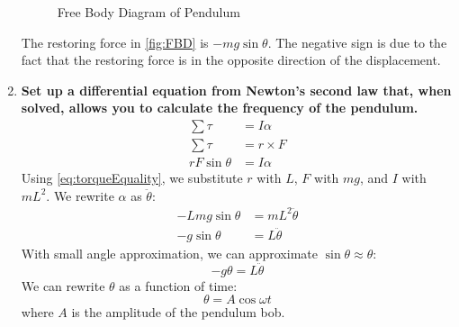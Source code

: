 \documentclass[article, 12pt]{article}
\begin{document}
\begin{enumerate}[1)]
\begin{figure}[H]
        \caption{Free Body Diagram of Pendulum}
        \label{fig:FBD}
    \end{figure}
    The restoring force in \autoref{fig:FBD} is $-mg\sin{\theta}$. The negative sign is due to the fact that the restoring force is in the opposite direction of the displacement.
    \item \textbf{Set up a differential equation from Newton's second law that, when solved, allows you to calculate the frequency of the pendulum.} \label{q:diffRotation} \\
    \begin{align}        \label{eq:torqueEquality}
        \sum \tau &= I\alpha \nonumber \\
        \sum \tau &= r \times F \nonumber \\
        rF\sin{\theta} &= I\alpha
    \end{align}
    Using \autoref{eq:torqueEquality}, we substitute $r$ with $L$, $F$ with $mg$, and $I$ with $mL^2$. We rewrite $\alpha$ as $\ddot{\theta}$:
    \begin{align}
        -Lmg\sin{\theta} &= mL^2\ddot{\theta} \nonumber \\
        -g\sin{\theta} &= L\ddot{\theta}
    \end{align}
    With small angle approximation, we can approximate $\sin{\theta} \approx \theta$:
    \begin{equation}        \label{eq:torqueSmallAngleApprox}
        -g\theta = L\ddot{\theta}
    \end{equation}
    We can rewrite $\theta$ as a function of time:
    \begin{equation}        \label{eq:theta}
        \theta = A\cos{\omega t}
    \end{equation}
    where $A$ is the amplitude of the pendulum bob.
    

\end{enumerate}
\end{document}
